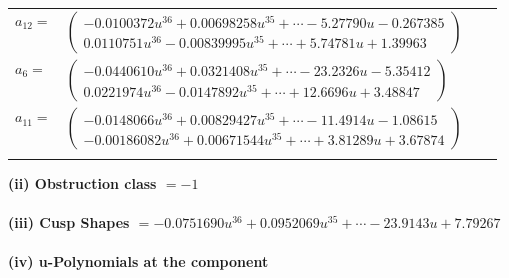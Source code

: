 \documentclass[1p]{elsarticle_modified}
\theoremstyle{definition}
\begin{document}
\begin{tabular}{m{7pt} m{180pt} m{7pt} m{180pt} }
\flushright $a_{12}=$&$\begin{pmatrix}-0.0100372 u^{36}+0.00698258 u^{35}+\cdots-5.27790 u-0.267385\\0.0110751 u^{36}-0.00839995 u^{35}+\cdots+5.74781 u+1.39963\end{pmatrix}$ \\
\flushright $a_{6}=$&$\begin{pmatrix}-0.0440610 u^{36}+0.0321408 u^{35}+\cdots-23.2326 u-5.35412\\0.0221974 u^{36}-0.0147892 u^{35}+\cdots+12.6696 u+3.48847\end{pmatrix}$ \\
\flushright $a_{11}=$&$\begin{pmatrix}-0.0148066 u^{36}+0.00829427 u^{35}+\cdots-11.4914 u-1.08615\\-0.00186082 u^{36}+0.00671544 u^{35}+\cdots+3.81289 u+3.67874\end{pmatrix}$\\&\end{tabular}
\flushleft \textbf{(ii) Obstruction class $= -1$}\\~\\
\flushleft \textbf{(iii) Cusp Shapes $= -0.0751690 u^{36}+0.0952069 u^{35}+\cdots-23.9143 u+7.79267$}\\~\\
\newpage\renewcommand{\arraystretch}{1}
\flushleft \textbf{(iv) u-Polynomials at the component}\newline \\
\end{document}
